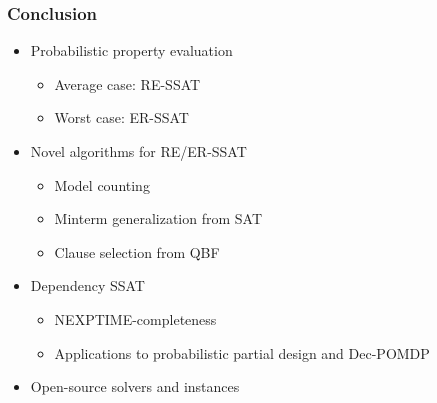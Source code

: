 \begin{frame}
      \frametitle{Conclusion}
      \begin{itemize}
            \item Probabilistic property evaluation
                  \begin{itemize}
                        \item Average case: RE-SSAT
                        \item Worst case: ER-SSAT
                  \end{itemize}
                  \pause
            \item Novel algorithms for RE/ER-SSAT
                  \begin{itemize}
                        \item Model counting
                        \item Minterm generalization from SAT
                        \item Clause selection from QBF
                  \end{itemize}
                  \pause
            \item Dependency SSAT
                  \begin{itemize}
                        \item NEXPTIME-completeness
                        \item Applications to probabilistic partial design and Dec-POMDP
                  \end{itemize}
                  \pause
            \item Open-source solvers and instances
      \end{itemize}
\end{frame}

